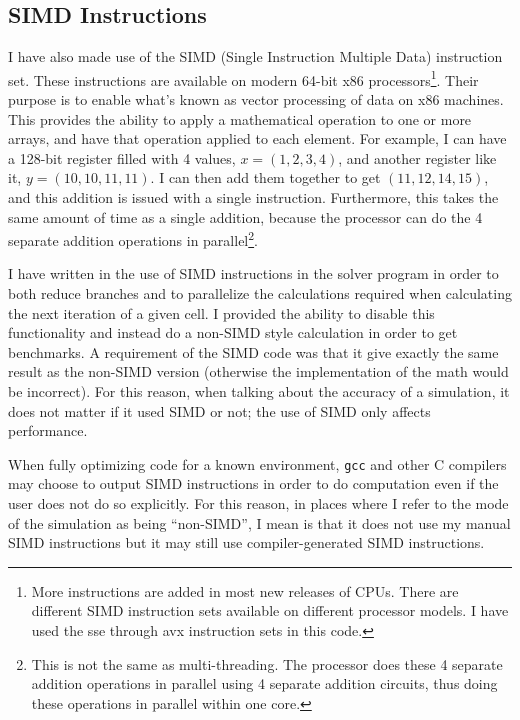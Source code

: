 \subsection{SIMD Instructions}
I have also made use of the SIMD (Single Instruction Multiple Data) instruction set. These instructions are available
on modern 64-bit x86 processors\cite{intel-3a}\footnote{More instructions are added in most new releases of CPUs. There are different
SIMD instruction sets available on different processor models. I have used the sse through avx instruction sets in this
code.}. Their purpose is to enable what's known as vector processing of data on x86 machines. This provides the ability
to apply a mathematical operation to one or more arrays, and have that operation applied to each element. For example,
I can have a 128-bit register filled with 4 values, $x=(1,2,3,4)$, and another register like it, $y=(10, 10, 11, 11)$. I can
then add them together to get $(11, 12, 14, 15)$, and this addition is issued with a single instruction. Furthermore, this
takes the same amount of time as a single addition, because the processor can do the 4 separate addition operations in
parallel\footnote{This is not the same as multi-threading. The processor does these 4 separate addition operations in parallel
using 4 separate addition circuits, thus doing these operations in parallel within one core.}.

I have written in the use of SIMD instructions in the solver program in order to both reduce branches and to parallelize
the calculations required when calculating the next iteration of a given cell. I provided the ability to disable this
functionality and instead do a non-SIMD style calculation in order to get benchmarks. A requirement of the SIMD code was
that it give exactly the same result as the non-SIMD version (otherwise the implementation of the math would be incorrect).
For this reason, when talking about the accuracy of a simulation, it does not matter if it used SIMD or not; the use
of SIMD only affects performance.

When fully optimizing code for a known environment, \texttt{gcc} and other C compilers may choose to output
SIMD instructions in order to do computation even if the user does not do so explicitly. For this reason, in places where
I refer to the mode of the simulation as being ``non-SIMD'', I mean is that it does not use my manual SIMD instructions
but it may still use compiler-generated SIMD instructions.

















